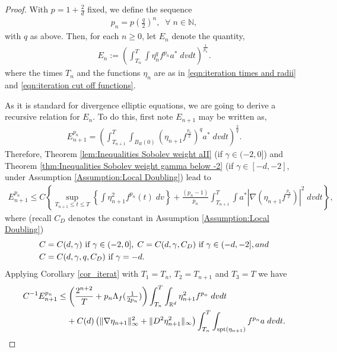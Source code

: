 \documentclass[12pt,american]{amsart}
\numberwithin{equation}{section}
\theoremstyle{plain}
\theoremstyle{definition}                  %
\def\astar{{a^*}}
\begin{document}
\begin{proof}
  With $p=1+\tfrac{2}{d}$ fixed, we define the sequence
  \begin{align*}
    p_n = p \left (\frac{q}{2} \right)^n,\;\;\forall\;n\in\mathbb{N},
  \end{align*}	  
  with $q$ as above. Then, for each $n\ge 0$, let $E_n$ denote the quantity,
  \begin{align*}
    E_n := \left ( \int_{T_n}^T\int \eta_n^q f^{p_n}\astar\;dvdt\right )^{\frac{1}{p_n}}.
  \end{align*}
  where the times $T_n$ and the functions $\eta_n$ are as in \eqref{eqn:iteration times and radii} and \eqref{eqn:iteration cut off functions}. 
  
  As it is standard for divergence elliptic equations, we are going to derive a recursive relation for $E_n$. To do this, first note $E_{n+1}$ may be written as,
  \begin{align*}
    E_{n+1}^{p_{n}} = \left ( \int_{T_{n+1}}^T\int_{B_R(0)}  \left ( \eta_{n+1} f^{\frac{p_{n}}{2}}\right )^{q}\astar\;dvdt \right )^{\frac{2}{q}}.
  \end{align*}
 Therefore, Theorem \ref{lem:Inequalities Sobolev weight aII} (if $\gamma\in(-2,0]$) and Theorem \ref{thm:Inequalities Sobolev weight gamma below -2} (if $\gamma\in[-d,-2]$, under Assumption \ref{Assumption:Local Doubling}) lead to
  \begin{align*}
     E_{n+1}^{p_{n}} \leq C \left \{ \sup \limits_{T_{n+1} \leq t\leq T} \left \{ \int \eta_{n+1}^2 f^{p_n}(t)\;dv \right \} + \frac{(p_n-1)}{p_n}\int_{T_{n+1}}^{T}\int a^* |\nabla (\eta_{n+1} f^{\frac{p_n}{2}})|^2\;dvdt \right \},
  \end{align*}
  where (recall $C_D$ denotes the constant in Assumption \ref{Assumption:Local Doubling})
  \begin{align*}
    C & = C(d,\gamma) \textnormal{ if } \gamma \in (-2,0], \; C = C(d,\gamma,C_D) \textnormal{ if } \gamma \in (-d,-2], and\\
    C & = C(d,\gamma,q,C_D) \textnormal{ if } \gamma=-d.
  \end{align*}
  Applying Corollary \ref{cor_iterat} with $T_1 = T_n$, $T_2 = T_{n+1}$ and $T_3 = T$ we have 
  \begin{align*}
    C^{-1}E_{n+1}^{p_{n}} & \leq \left( \frac{2^{n+2}}{T}+ p_n\Lambda_f (\tfrac{1}{2p_n})  \right) \int_{T_n}^{T}\int_{\mathbb{R}^d} \eta_{n+1}^2f^{p_n}\;dvdt\\
    & \;\;\;\;+C(d)\left ( \|\nabla \eta_{n+1}\|_{\infty}^2+\|D^2\eta_{n+1}^2\|_{\infty} \right )\int_{T_n}^{T}\int_{\textnormal{spt}(\eta_{n+1})}  f^{p_n}a \;dvdt.

\end{align*}
\end{proof}
\end{document}
